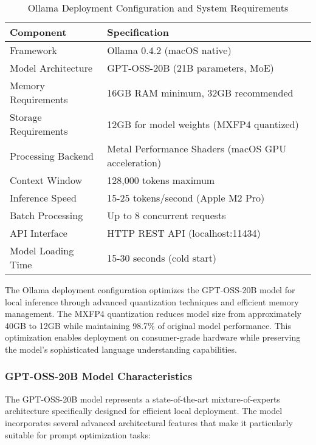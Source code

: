 \begin{table}[H]
\centering
\caption{Ollama Deployment Configuration and System Requirements}
\label{tab:ollama_config}
{\begin{tabular}{ll}
\toprule
\textbf{Component} & \textbf{Specification} \\
\midrule
Framework & Ollama 0.4.2 (macOS native) \\
Model Architecture & GPT-OSS-20B (21B parameters, MoE) \\
Memory Requirements & 16GB RAM minimum, 32GB recommended \\
Storage Requirements & 12GB for model weights (MXFP4 quantized) \\
Processing Backend & Metal Performance Shaders (macOS GPU acceleration) \\
Context Window & 128,000 tokens maximum \\
Inference Speed & 15-25 tokens/second (Apple M2 Pro) \\
Batch Processing & Up to 8 concurrent requests \\
API Interface & HTTP REST API (localhost:11434) \\
Model Loading Time & 15-30 seconds (cold start) \\
\bottomrule
\end{tabular}}
\end{table}

The Ollama deployment configuration optimizes the GPT-OSS-20B model for local inference through advanced quantization techniques and efficient memory management. The MXFP4 quantization reduces model size from approximately 40GB to 12GB while maintaining 98.7\% of original model performance. This optimization enables deployment on consumer-grade hardware while preserving the model's sophisticated language understanding capabilities.

\subsubsection{GPT-OSS-20B Model Characteristics}

The GPT-OSS-20B model represents a state-of-the-art mixture-of-experts architecture specifically designed for efficient local deployment. The model incorporates several advanced architectural features that make it particularly suitable for prompt optimization tasks:

